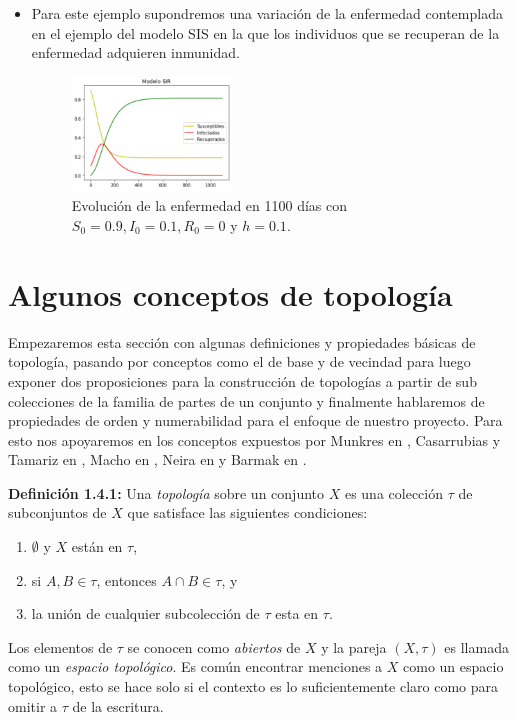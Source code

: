 \begin{itemize}
    \item Para este ejemplo supondremos una variación de la enfermedad contemplada en el ejemplo del modelo SIS en la que los individuos que se recuperan de la enfermedad adquieren inmunidad.
    
    \begin{figure}[h]
      \centering
        \includegraphics[width=0.4\textwidth]{Imagenes/ex1SIR.PNG}
      \caption{\centering Evolución de la enfermedad en 1100 días con $S_0=0.9,I_0=0.1,R_0=0$ y $h=0.1$.}
      \label{fig:Ejemplo 1 - SIR}
    \end{figure}
\end{itemize}

\section{Algunos conceptos de topología}\label{sec:Algunos conceptos de topología}

Empezaremos esta sección con algunas definiciones y propiedades básicas de topología, pasando por conceptos como el de base y de vecindad para luego exponer dos proposiciones para la construcción de topologías a partir de sub colecciones de la familia de partes de un conjunto y finalmente hablaremos de propiedades de orden y numerabilidad para el enfoque de nuestro proyecto. Para esto nos apoyaremos en los conceptos expuestos por Munkres en \cite{munkres}, Casarrubias y Tamariz en \cite{elementosTopologiaGeneral}, Macho en \cite{stadler2002}, Neira en \cite{NeiraNacional} y Barmak en \cite{barmak2011}.

\textbf{Definición 1.4.1:} Una \textit{topología} sobre un conjunto $X$ es una colección $\tau$ de subconjuntos de $X$ que satisface las siguientes condiciones:
\begin{enumerate}
    \item $\emptyset$ y $X$ están en $\tau$,
    \item si $A,B\in\tau$, entonces $A\cap B\in\tau$, y 
    \item la unión de cualquier subcolección de $\tau$ esta en $\tau$.
\end{enumerate}
Los elementos de $\tau$ se conocen como \textit{abiertos} de $X$ y la pareja $(X,\tau)$ es llamada como un \textit{espacio topológico}. Es común encontrar menciones a $X$ como un espacio topológico, esto se hace solo si el contexto es lo suficientemente claro como para omitir a $\tau$ de la escritura.

